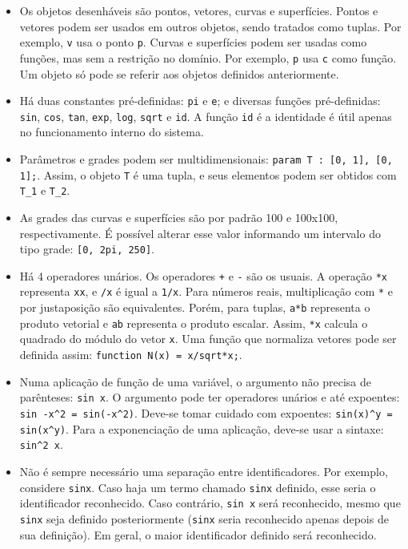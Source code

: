 \begin{itemize}
\item
Os objetos desenháveis são pontos, vetores, curvas e superfícies.
Pontos e vetores podem ser usados em outros objetos, sendo tratados como tuplas.
Por exemplo, \texttt{v} usa o ponto \texttt{p}.
Curvas e superfícies podem ser usadas como funções, mas sem a restrição no domínio.
Por exemplo, \texttt{p} usa \texttt{c} como função.
Um objeto só pode se referir aos objetos definidos anteriormente.

\item
Há duas constantes pré-definidas: \texttt{pi} e \texttt{e};
e diversas funções pré-definidas:
\texttt{sin}, \texttt{cos}, \texttt{tan},
\texttt{exp}, \texttt{log}, \texttt{sqrt} e \texttt{id}.
A função \texttt{id} é a identidade é útil apenas no funcionamento interno do sistema.

\item
Parâmetros e grades podem ser multidimensionais:
\texttt{param T : [0, 1], [0, 1];}. Assim, o objeto \texttt{T} é uma tupla,
e seus elementos podem ser obtidos com \texttt{T\_1} e \texttt{T\_2}.

\item As grades das curvas e superfícies são por padrão 100 e 100x100, respectivamente.
É possível alterar esse valor informando um intervalo do
tipo grade: \texttt{[0, 2pi, 250]}.

\item
Há 4 operadores unários. Os operadores \texttt{+} e \texttt{-} são os usuais.
A operação \texttt{*x} representa \texttt{xx}, e \texttt{/x} é igual a \texttt{1/x}.
Para números reais, multiplicação com \texttt{*} e por justaposição são equivalentes.
Porém, para tuplas, \texttt{a*b} representa o produto vetorial
e \texttt{ab} representa o produto escalar.
Assim, \texttt{*x} calcula o quadrado do módulo do vetor \texttt{x}.
Uma função que normaliza vetores pode ser
definida assim: \texttt{function N(x) = x/sqrt*x;}.

\item
Numa aplicação de função de uma variável, o argumento não precisa de parênteses:
\texttt{sin x}.
O argumento pode ter operadores unários e até expoentes:
\texttt{sin -x\textasciicircum2 = sin(-x\textasciicircum2)}.
Deve-se tomar cuidado com expoentes:
\texttt{sin(x)\textasciicircum y = sin(x\textasciicircum y)}.
Para a exponenciação de uma aplicação,
deve-se usar a sintaxe: \texttt{sin\textasciicircum2 x}.

\item
Não é sempre necessário uma separação entre identificadores.
Por exemplo, considere \texttt{sinx}.
Caso haja um termo chamado \texttt{sinx} definido, esse seria o
identificador reconhecido.
Caso contrário, \texttt{sin x} será reconhecido,
mesmo que \texttt{sinx} seja definido posteriormente
(\texttt{sinx} seria reconhecido apenas depois de sua definição).
Em geral, o maior identificador definido será reconhecido.
\end{itemize}

